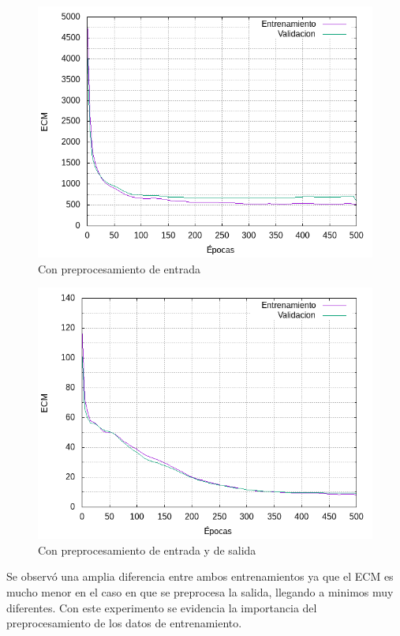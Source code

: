 \begin{figure}[H]
  \includegraphics[width=125mm]{imagenes/ej2/ex_1-1_red-9-17-2_errors.png}
  \caption{Con preprocesamiento de entrada}
\end{figure}

\begin{figure}[H]
  \includegraphics[width=125mm]{imagenes/ej2/ex_1-2_red-9-17-2_errors.png}
  \caption{Con preprocesamiento de entrada y de salida}
\end{figure}

Se observó una amplia diferencia entre ambos entrenamientos ya que el ECM es mucho menor en el caso en que se preprocesa la salida, llegando
a minimos muy diferentes. Con este experimento se evidencia la importancia del preprocesamiento de los datos de entrenamiento.

